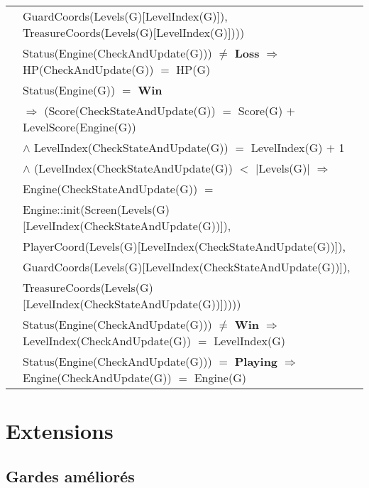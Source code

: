 \documentclass[8pt]{article}
\begin{document}
{\begin{longtable}{rl}
  & \quad\quad\quad\quad\quad\quad  \textrm{GuardCoords(Levels(G)[LevelIndex(G)]), TreasureCoords(Levels(G)[LevelIndex(G)]))})\\
  & \textrm{Status(Engine(CheckAndUpdate(G)))} $\neq$ \textbf{Loss} $\Rightarrow$ \textrm{HP(CheckAndUpdate(G))} $=$ \textrm{HP(G)}\\
  & \textrm{Status(Engine(G))} $=$ \textbf{Win}\\
  & \quad\quad $\Rightarrow$ (\textrm{Score(CheckStateAndUpdate(G))} $=$ \textrm{Score(G)} $+$ \textrm{LevelScore(Engine(G))}\\
  & \quad\quad\quad\quad $\land$ \textrm{LevelIndex(CheckStateAndUpdate(G))} $=$ \textrm{LevelIndex(G)} $+$ 1\\
  & \quad\quad\quad\quad $\land$ (\textrm{LevelIndex(CheckStateAndUpdate(G))} $<$ \textrm{$|$Levels(G)$|$} $\Rightarrow$\\
  & \quad\quad\quad\quad\quad\quad \textrm{Engine(CheckStateAndUpdate(G))} $=$\\
  & \quad\quad\quad\quad\quad\quad  \textrm{Engine::init(Screen(Levels(G)[LevelIndex(CheckStateAndUpdate(G))]),}\\
  & \quad\quad\quad\quad\quad\quad\quad\quad \textrm{PlayerCoord(Levels(G)[LevelIndex(CheckStateAndUpdate(G))]),}\\
  & \quad\quad\quad\quad\quad\quad\quad\quad  \textrm{GuardCoords(Levels(G)[LevelIndex(CheckStateAndUpdate(G))]),}\\
  & \quad\quad\quad\quad\quad\quad\quad\quad  \textrm{TreasureCoords(Levels(G)[LevelIndex(CheckStateAndUpdate(G))]))}))\\
  & \textrm{Status(Engine(CheckAndUpdate(G)))} $\neq$ \textbf{Win} $\Rightarrow$ \textrm{LevelIndex(CheckAndUpdate(G))} $=$ \textrm{LevelIndex(G)}\\
  & \textrm{Status(Engine(CheckAndUpdate(G)))} $=$ \textbf{Playing} $\Rightarrow$ \textrm{Engine(CheckAndUpdate(G))} $=$ \textrm{Engine(G)}\\
\end{longtable}}

\section{Extensions}

\subsection{Gardes améliorés}
\end{document}
